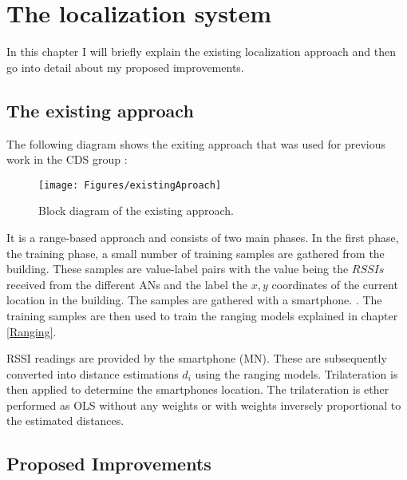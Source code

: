 \chapter{The localization system} %

\label{Chapter3} %

In this chapter I will briefly explain the existing localization approach and then go into detail about my proposed improvements.

\section{The existing approach}

The following diagram shows the exiting approach that was used for previous work in the CDS group \cite{JoseMaster}:

\begin{figure}[ht]
\centering
\texttt{[image: Figures/existingAproach]}
\decoRule
\caption[The existing approach]{Block diagram of the existing approach.}
\label{fig:existingApproach}
\end{figure}

It is a range-based approach and consists of two main phases. In the first phase, the training phase, a small number of training samples are gathered from the building. These samples are value-label pairs with the value being the \(RSSIs\) received from the different ANs and the label the \(x,y\) coordinates of the current location in the building. The samples are gathered with a smartphone. . The training samples are then used to train the ranging models explained in chapter \ref{Ranging}.

 RSSI readings are provided by the smartphone (MN). These are subsequently converted into distance estimations \(d_i\)  using the ranging models. Trilateration is then applied to determine the smartphones location. The trilateration is ether performed as OLS without any weights or with weights inversely proportional to the estimated distances.

\section{Proposed Improvements}

